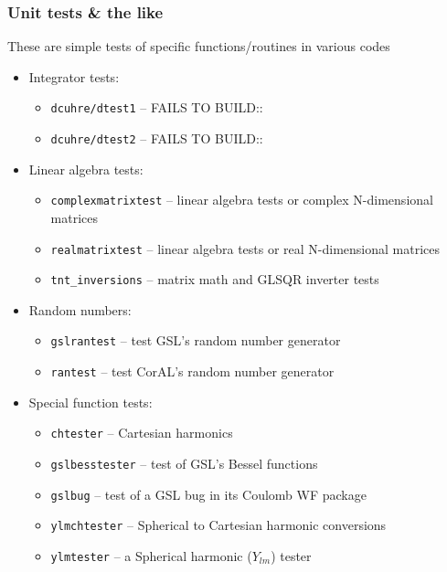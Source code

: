 \documentclass[10pt]{article}
\begin{document}
\subsubsection{Unit tests \& the like} 
These are simple tests of specific functions/routines in various codes

\begin{itemize}

	\item Integrator tests:

    	\begin{itemize}
    		\item \texttt{dcuhre/dtest1} -- FAILS TO BUILD::
    		\item \texttt{dcuhre/dtest2} -- FAILS TO BUILD::
    	\end{itemize}


	\item Linear algebra tests:

    	\begin{itemize}
    		\item \texttt{complexmatrixtest} -- linear algebra tests or complex N-dimensional matrices
    		\item \texttt{realmatrixtest} -- linear algebra tests or real N-dimensional matrices
    		\item \texttt{tnt\_inversions} -- matrix math and GLSQR inverter tests
    	\end{itemize}


	\item Random numbers:

    	\begin{itemize}
    		\item \texttt{gslrantest} -- test GSL's random number generator
    		\item \texttt{rantest} -- test CorAL's random number generator
    	\end{itemize}


	\item Special function tests:

    	\begin{itemize}
    		\item \texttt{chtester} -- Cartesian harmonics
    		\item \texttt{gslbesstester} -- test of GSL's Bessel functions
    		\item \texttt{gslbug} -- test of a GSL bug in its Coulomb WF package
    		\item \texttt{ylmchtester} -- Spherical to Cartesian harmonic conversions
    		\item \texttt{ylmtester} -- a Spherical harmonic ($Y_{lm}$) tester
    	\end{itemize}



\end{itemize}
\end{document}
